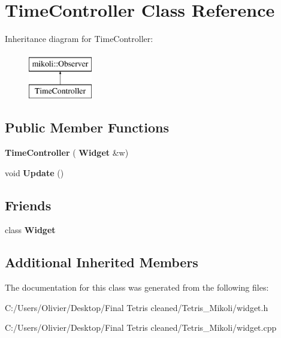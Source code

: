 \section{Time\+Controller Class Reference}
\label{class_time_controller}
Inheritance diagram for Time\+Controller\+:\begin{figure}[H]
\begin{center}
\leavevmode
\includegraphics[height=2.000000cm]{class_time_controller}
\end{center}
\end{figure}
\subsection*{Public Member Functions}
\begin{DoxyCompactItemize}
\item 
\mbox{\label{class_time_controller_ab7f47ef57f580761ee0f5dfd72258af7}} 
{\bfseries Time\+Controller} (\textbf{ Widget} \&w)
\item 
\mbox{\label{class_time_controller_a30806fb1b26d4a377bf6ae086efd4ed9}} 
void {\bfseries Update} ()
\end{DoxyCompactItemize}
\subsection*{Friends}
\begin{DoxyCompactItemize}
\item 
\mbox{\label{class_time_controller_a29fa75ce3911bef8c5f4414f6f0242b8}} 
class {\bfseries Widget}
\end{DoxyCompactItemize}
\subsection*{Additional Inherited Members}


The documentation for this class was generated from the following files\+:\begin{DoxyCompactItemize}
\item 
C\+:/\+Users/\+Olivier/\+Desktop/\+Final Tetris cleaned/\+Tetris\+\_\+\+Mikoli/widget.\+h\item 
C\+:/\+Users/\+Olivier/\+Desktop/\+Final Tetris cleaned/\+Tetris\+\_\+\+Mikoli/widget.\+cpp\end{DoxyCompactItemize}
